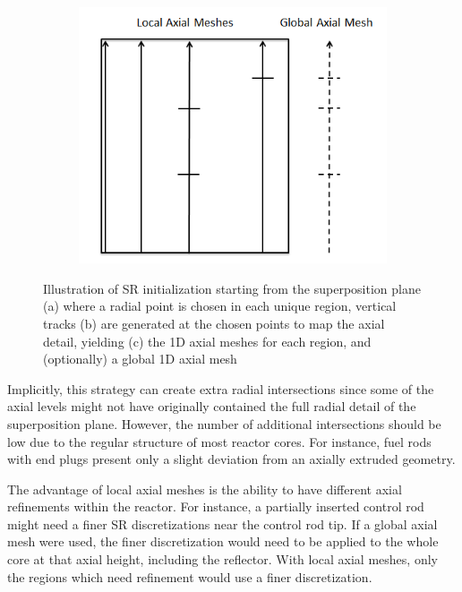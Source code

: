 \begin{figure}[h!]
\begin{subfigure}[b]{0.28\textwidth}
		\caption{}
		\label{fig:fsr-init-b}
	\end{subfigure}
	\begin{subfigure}[b]{0.4\textwidth}
		\centering
		\includegraphics[width=\linewidth]{figures/ph2016/fsr-init-c.PNG}
		\caption{}
		\label{fig:fsr-init-c}
	\end{subfigure}
	\caption[]{Illustration of \ac{SR} initialization starting from the superposition plane (a) where a radial point is chosen in each unique region, vertical tracks (b) are generated at the chosen points to map the axial detail, yielding (c) the 1D axial meshes for each region, and (optionally) a global 1D axial mesh}
	\label{fig:fsr-initialization}
\end{figure}

Implicitly, this strategy can create extra radial intersections since some of the axial levels might not have originally contained the full radial detail of the superposition plane. However, the number of additional intersections should be low due to the regular structure of most reactor cores. For instance, fuel rods with end plugs present only a slight deviation from an axially extruded geometry.

The advantage of local axial meshes is the ability to have different axial refinements within the reactor. For instance, a partially inserted control rod might need a finer \ac{SR} discretizations near the control rod tip. If a global axial mesh were used, the finer discretization would need to be applied to the whole core at that axial height, including the reflector. With local axial meshes, only the regions which need refinement would use a finer discretization.

